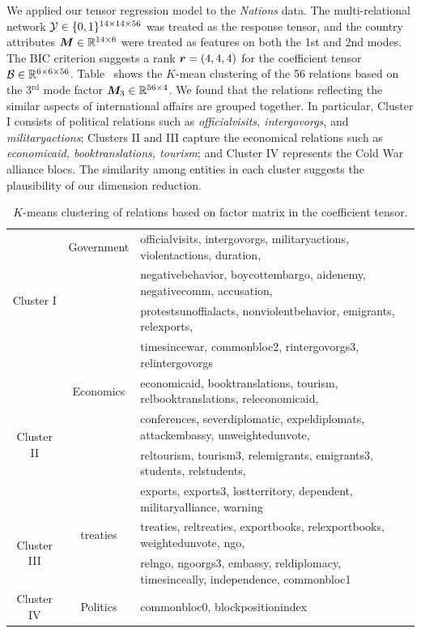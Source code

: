 \documentclass[12pt]{article}
\theoremstyle{plain}
\theoremstyle{definition}
\begin{document}
We applied our tensor regression model to the \emph{Nations} data. The multi-relational network $\mathcal{Y}\in\{0,1\}^{14\times 14\times 56}$ was treated as the response tensor, and the country attributes $\bm M\in\mathbb{R}^{14\times 6}$ were treated as features on both the 1st and 2nd modes. The BIC criterion suggests a rank $\bm{r}=(4,4,4)$ for the coefficient tensor $\mathcal{B}\in\mathbb{R}^{6\times 6 \times 56}$. Table~ shows the $K$-mean clustering of the 56 relations based on the 3$^\text{rd}$ mode factor $\bm M_3\in\mathbb{R}^{56\times 4}$. We found that the relations reflecting the similar aspects of international affairs are grouped together. In particular, Cluster I consists of political relations such as \emph{officialvisits, intergovorgs}, and \emph{militaryactions}; Clusters II and III capture the economical relations such as \emph{economicaid, booktranslations, tourism}; and Cluster IV represents the Cold War alliance blocs. The similarity among entities in each cluster suggests the plausibility of our dimension reduction. 



\begin{table}[H]
\begin{tabular}{c|c|l}
\hline
\multirow{4}{*}{Cluster I}  & Government &officialvisits, intergovorgs,  militaryactions, violentactions, duration, \\
&&negativebehavior, boycottembargo, aidenemy, negativecomm, accusation, \\
& &protestsunoffialacts,    nonviolentbehavior, emigrants, relexports,   \\
& &timesincewar, commonbloc2, rintergovorgs3, relintergovorgs\\
\hline
\multirow{4}{*}{Cluster II}& Economics &economicaid, booktranslations, tourism, relbooktranslations, releconomicaid, \\
&& conferences, severdiplomatic, expeldiplomats, attackembassy, unweightedunvote,\\
&& reltourism, tourism3, relemigrants, emigrants3, students, relstudents, \\
&&exports, exports3, lostterritory, dependent, militaryalliance, warning  \\
\hline
\multirow{2}{*}{Cluster III} & treaties &treaties, reltreaties, exportbooks, relexportbooks, weightedunvote, ngo, \\
&&relngo, ngoorgs3, embassy, reldiplomacy, timesinceally, independence, commonbloc1\\
\hline
Cluster IV & Politics &commonbloc0, blockpositionindex\\
\end{tabular}
\caption{$K$-means clustering of relations based on factor matrix in the coefficient tensor.}\label{tab:s1}
\end{table}
\end{document}
